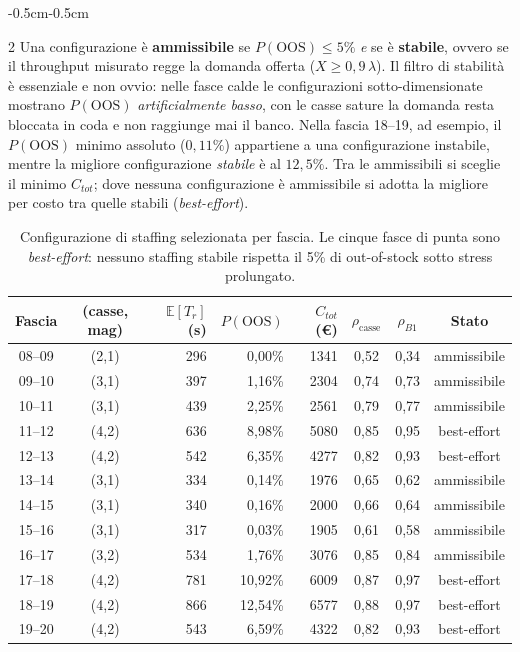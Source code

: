 \documentclass{article}
\begin{document}
\begin{adjustwidth}{-0.5cm}{-0.5cm}
\begin{multicols}{2}
Una configurazione è \textbf{ammissibile} se $P(\text{OOS}) \le 5\%$ \emph{e} se è
\textbf{stabile}, ovvero se il throughput misurato regge la domanda offerta ($X \ge 0{,}9\,
\lambda$). Il filtro di stabilità è essenziale e non ovvio: nelle fasce calde le configurazioni
sotto-dimensionate mostrano $P(\text{OOS})$ \emph{artificialmente basso},  con le casse sature
la domanda resta bloccata in coda e non raggiunge mai il banco. Nella fascia 18--19, ad esempio, il $P(\text{OOS})$ minimo assoluto
($0{,}11\%$) appartiene a una configurazione instabile, mentre la migliore configurazione
\emph{stabile} è al $12{,}5\%$. Tra le ammissibili si sceglie il minimo $C_{tot}$; dove nessuna
configurazione è ammissibile si adotta la migliore per costo tra quelle stabili
(\emph{best-effort}).
\end{multicols}

\begin{table}[ht]
\centering
\renewcommand{\arraystretch}{1.2}
\begin{tabular}{|c|c|r|r|r|c|c|c|}
\hline
\textbf{Fascia} & \textbf{(casse, mag)} & $\mathbb{E}[T_r]$ (s) & $P(\text{OOS})$ &
$C_{tot}$ (\euro) & $\rho_{\text{casse}}$ & $\rho_{B1}$ & \textbf{Stato} \\
\hline
08--09 & (2,1) & 296 & 0{,}00\%  & 1341 & 0{,}52 & 0{,}34 & ammissibile \\
09--10 & (3,1) & 397 & 1{,}16\%  & 2304 & 0{,}74 & 0{,}73 & ammissibile \\
10--11 & (3,1) & 439 & 2{,}25\%  & 2561 & 0{,}79 & 0{,}77 & ammissibile \\
11--12 & (4,2) & 636 & 8{,}98\%  & 5080 & 0{,}85 & 0{,}95 & best-effort \\
12--13 & (4,2) & 542 & 6{,}35\%  & 4277 & 0{,}82 & 0{,}93 & best-effort \\
13--14 & (3,1) & 334 & 0{,}14\%  & 1976 & 0{,}65 & 0{,}62 & ammissibile \\
14--15 & (3,1) & 340 & 0{,}16\%  & 2000 & 0{,}66 & 0{,}64 & ammissibile \\
15--16 & (3,1) & 317 & 0{,}03\%  & 1905 & 0{,}61 & 0{,}58 & ammissibile \\
16--17 & (3,2) & 534 & 1{,}76\%  & 3076 & 0{,}85 & 0{,}84 & ammissibile \\
17--18 & (4,2) & 781 & 10{,}92\% & 6009 & 0{,}87 & 0{,}97 & best-effort \\
18--19 & (4,2) & 866 & 12{,}54\% & 6577 & 0{,}88 & 0{,}97 & best-effort \\
19--20 & (4,2) & 543 & 6{,}59\%  & 4322 & 0{,}82 & 0{,}93 & best-effort \\
\hline
\end{tabular}
\caption{Configurazione di staffing selezionata per fascia. Le
cinque fasce di punta sono \emph{best-effort}: nessuno staffing stabile rispetta il 5\% di
out-of-stock sotto stress prolungato.}
\end{table}


\end{adjustwidth}
\end{document}

